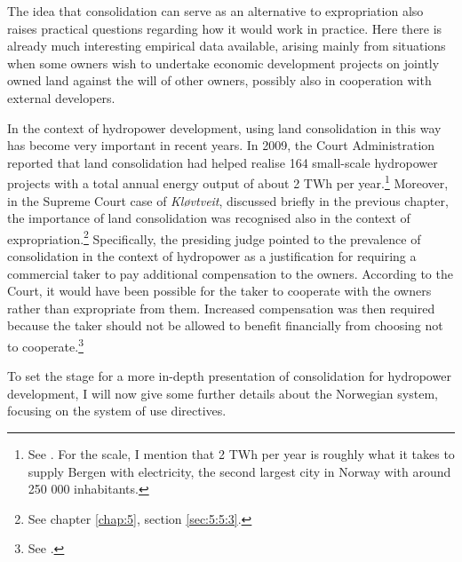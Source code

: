 
The idea that consolidation can serve as an alternative to expropriation also raises practical questions regarding how it would work in practice. Here there is already much interesting empirical data available, arising mainly from situations when some owners wish to undertake economic development projects on jointly owned land against the will of other owners, possibly also in cooperation with external developers.

In the context of hydropower development, using land consolidation in this way has become very important in recent years. In 2009, the Court Administration reported that land consolidation had helped realise 164 small-scale hydropower projects with a total annual energy output of about 2 TWh per year.\footnote{See \cite{gevinst09}. For the scale, I mention that 2 TWh per year is roughly what it takes to supply Bergen with electricity, the second largest city in Norway with around 250 000 inhabitants.} Moreover, in the Supreme Court case of {\it Kløvtveit}, discussed briefly in the previous chapter, the importance of land consolidation was recognised also in the context of expropriation.\footnote{See chapter \ref{chap:5}, section \ref{sec:5:5:3}.} Specifically, the presiding judge pointed to the prevalence of consolidation in the context of hydropower as a justification for requiring a commercial taker to pay additional compensation to the owners. According to the Court, it would have been possible for the taker to cooperate with the owners rather than expropriate from them. Increased compensation was then required because the taker should not be allowed to benefit financially from choosing not to cooperate.\footnote{See \cite{klovtveit11}.}

To set the stage for a more in-depth presentation of consolidation for hydropower development, I will now give some further details about the Norwegian system, focusing on the system of use directives. %

